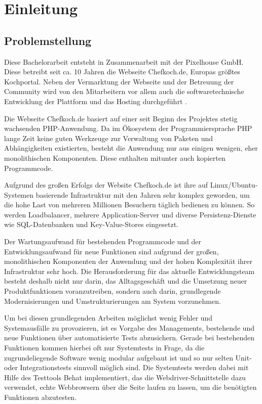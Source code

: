 \section{Einleitung}

\subsection{Problemstellung}

Diese Bachelorarbeit entsteht in Zusammenarbeit mit der Pixelhouse GmbH. Diese betreibt seit ca. 10 Jahren die Webseite Chefkoch.de, Europas größtes Kochportal. Neben der Vermarktung der Webseite und der Betreuung der Community wird von den Mitarbeitern vor allem auch die softwaretechnische Entwicklung der Plattform und das Hosting durchgeführt \citep[Vgl.][]{pixelhouse14}.

Die Webseite Chefkoch.de basiert auf einer seit Beginn des Projektes stetig wachsenden PHP-Anwendung. Da im Ökosystem der Programmiersprache PHP lange Zeit keine guten Werkzeuge zur Verwaltung von Paketen und Abhängigkeiten existierten, besteht die Anwendung nur aus einigen wenigen, eher monolithischen Komponenten. Diese enthalten mitunter auch kopierten Programmcode.

Aufgrund des großen Erfolgs der Website Chefkoch.de ist ihre auf Linux/Ubuntu-Systemen basierende Infrastruktur mit den Jahren sehr komplex geworden, um die hohe Last von mehreren Millionen Besuchern täglich bedienen zu können. So werden Loadbalancer, mehrere Application-Server und diverse Persistenz-Dienste wie SQL-Datenbanken und Key-Value-Stores eingesetzt.

Der Wartungsaufwand für bestehenden Programmcode und der Entwicklungsaufwand für neue Funktionen sind aufgrund der großen, monolithischen Komponenten der Anwendung und der hohen Komplexität ihrer Infrastruktur sehr hoch. Die Herausforderung für das aktuelle Entwicklungsteam besteht deshalb nicht nur darin, das Alltagsgeschäft und die Umsetzung neuer Produktfunktionen voranzutreiben, sondern auch darin, grundlegende Modernisierungen und Umstrukturierungen am System vorzunehmen.

Um bei diesen grundlegenden Arbeiten möglichst wenig Fehler und Systemausfälle zu provozieren, ist es Vorgabe des Managements, bestehende und neue Funktionen über automatisierte Tests abzusichern. Gerade bei bestehenden Funktionen kommen hierbei oft nur Systemtests in Frage, da die zugrundeliegende Software wenig modular aufgebaut ist und so nur selten Unit- oder Integrationstests sinnvoll möglich sind. Die Systemtests werden dabei mit Hilfe des Testtools Behat implementiert, das die Webdriver-Schnittstelle dazu verwendet, echte Webbrowsern über die Seite laufen zu lassen, um die benötigten Funktionen abzutesten.


